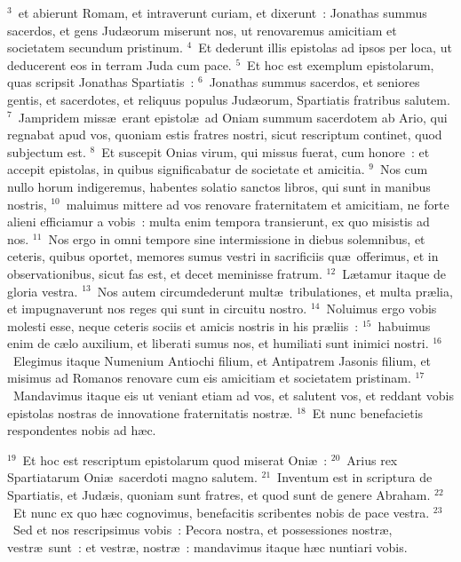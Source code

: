 ${}^{3}$~et abierunt Romam, et intraverunt curiam, et dixerunt~: Jonathas summus sacerdos, et gens Jud\ae orum miserunt nos, ut renovaremus amicitiam et societatem secundum pristinum.
${}^{4}$~Et dederunt illis epistolas ad ipsos per loca, ut deducerent eos in terram Juda cum pace.
${}^{5}$~Et hoc est exemplum epistolarum, quas scripsit Jonathas Spartiatis~:
${}^{6}$~Jonathas summus sacerdos, et seniores gentis, et sacerdotes, et reliquus populus Jud\ae orum, Spartiatis fratribus salutem.
${}^{7}$~Jampridem miss\ae\ erant epistol\ae\ ad Oniam summum sacerdotem ab Ario, qui regnabat apud vos, quoniam estis fratres nostri, sicut rescriptum continet, quod subjectum est.
${}^{8}$~Et suscepit Onias virum, qui missus fuerat, cum honore~: et accepit epistolas, in quibus significabatur de societate et amicitia.
${}^{9}$~Nos cum nullo horum indigeremus, habentes solatio sanctos libros, qui sunt in manibus nostris,
${}^{10}$~maluimus mittere ad vos renovare fraternitatem et amicitiam, ne forte alieni efficiamur a vobis~: multa enim tempora transierunt, ex quo misistis ad nos.
${}^{11}$~Nos ergo in omni tempore sine intermissione in diebus solemnibus, et ceteris, quibus oportet, memores sumus vestri in sacrificiis qu\ae\ offerimus, et in observationibus, sicut fas est, et decet meminisse fratrum.
${}^{12}$~L\ae tamur itaque de gloria vestra.
${}^{13}$~Nos autem circumdederunt mult\ae\ tribulationes, et multa pr\ae lia, et impugnaverunt nos reges qui sunt in circuitu nostro.
${}^{14}$~Noluimus ergo vobis molesti esse, neque ceteris sociis et amicis nostris in his pr\ae liis~:
${}^{15}$~habuimus enim de c\ae lo auxilium, et liberati sumus nos, et humiliati sunt inimici nostri.
${}^{16}$~Elegimus itaque Numenium Antiochi filium, et Antipatrem Jasonis filium, et misimus ad Romanos renovare cum eis amicitiam et societatem pristinam.
${}^{17}$~Mandavimus itaque eis ut veniant etiam ad vos, et salutent vos, et reddant vobis epistolas nostras de innovatione fraternitatis nostr\ae .
${}^{18}$~Et nunc benefacietis respondentes nobis ad h\ae c.


${}^{19}$~Et hoc est rescriptum epistolarum quod miserat Oni\ae~:
${}^{20}$~Arius rex Spartiatarum Oni\ae\ sacerdoti magno salutem.
${}^{21}$~Inventum est in scriptura de Spartiatis, et Jud\ae is, quoniam sunt fratres, et quod sunt de genere Abraham.
${}^{22}$~Et nunc ex quo h\ae c cognovimus, benefacitis scribentes nobis de pace vestra.
${}^{23}$~Sed et nos rescripsimus vobis~: Pecora nostra, et possessiones nostr\ae , vestr\ae\ sunt~: et vestr\ae , nostr\ae~: mandavimus itaque h\ae c nuntiari vobis.


